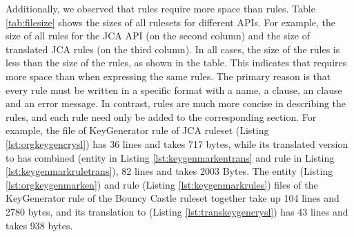 Additionally, we observed that \MARK{} rules require more space than \crysl{} rules. Table \ref{tab:filesize} shows the sizes of all rulesets for different APIs. For example, the size of all \crysl{} rules for the JCA API (on the second column) and the size of translated JCA \MARK{} rules (on the third column). In all cases, the size of the \crysl{} rules is less than the size of the \MARK{} rules, as shown in the table. This indicates that \MARK{} requires more space than \crysl{} when expressing the same rules. The primary reason is that every \MARK{} rule must be written in a specific format with a  name, a  clause, an  clause and an  error message. In contrast, \crysl{} rules are much more concise in describing the rules, and each rule need only be added to the corresponding section.
For example, the file of KeyGenerator \crysl{} rule of JCA ruleset (Listing \ref{lst:orgkeygencrysl}) has 36 lines and takes 717 bytes, while its translated version to \MARK{} has combined (entity in Listing \ref{lst:keygenmarkentrans} and rule in Listing \ref{lst:keygenmarkruletrans}), 82 lines and takes 2003 Bytes. The entity (Listing \ref{lst:orgkeygenmarken}) and rule (Listing \ref{lst:keygenmarkrules}) files of the \MARK{} KeyGenerator rule of the Bouncy Castle ruleset together take up 104 lines and 2780 bytes, and its translation to \crysl{} (Listing \ref{lst:transkeygencrysl}) has 43 lines and takes 938 bytes.

\begin{table}[H]
\caption{Sizes of the original and translated \MARK{} and \crysl{} rule files.}
\label{tab:filesize}
\end{table}